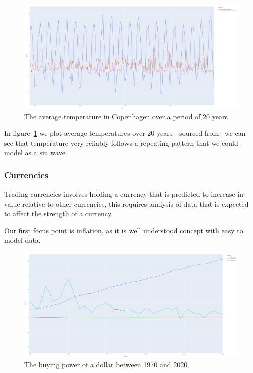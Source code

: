 \begin{figure}
    \centering
    \includegraphics[width=12cm]{figures/real_data_examples/cph_average_temp}
    \caption{The average temperature in Copenhagen over a period of 20 years}
    \label{fig:real_data_climate_cph}
\end{figure}

In figure~\ref{fig:real_data_climate_cph} we plot average temperatures over 20 years - sourced from~\cite{KaggleTemperature}
we can see that temperature very reliably follows a repeating pattern that we could model as a sin wave.

\subsubsection{Currencies}

Trading currencies involves holding a currency that is predicted to increase in value relative to other currencies,
this requires analysis of data that is expected to affect the strength of a currency.

Our first focus point is inflation, as it is well understood concept with easy to model data.

\begin{figure}
    \centering
    \includegraphics[width=12cm]{figures/real_data_examples/dollar_value_statistics}
    \caption{The buying power of a dollar between 1970 and 2020}
    \label{fig:real_data_inflation}
\end{figure}

